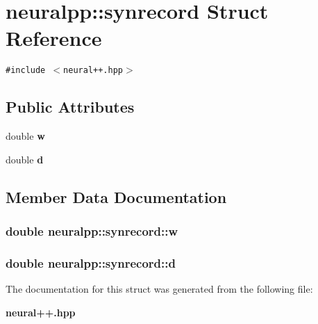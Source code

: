 \section{neuralpp::synrecord Struct Reference}
\label{structneuralpp_1_1synrecord}
{\tt \#include $<$neural++.hpp$>$}

\subsection*{Public Attributes}
\begin{CompactItemize}
\item 
double {\bf w}
\item 
double {\bf d}
\end{CompactItemize}


\subsection{Member Data Documentation}
\subsubsection[w]{\setlength{\rightskip}{0pt plus 5cm}double {\bf neuralpp::synrecord::w}}\label{structneuralpp_1_1synrecord_81a7dbc97eecbf5bc85cac46373a78d2}


\subsubsection[d]{\setlength{\rightskip}{0pt plus 5cm}double {\bf neuralpp::synrecord::d}}\label{structneuralpp_1_1synrecord_3a862082dfa0edffce84936818bab374}




The documentation for this struct was generated from the following file:\begin{CompactItemize}
\item 
{\bf neural++.hpp}\end{CompactItemize}
